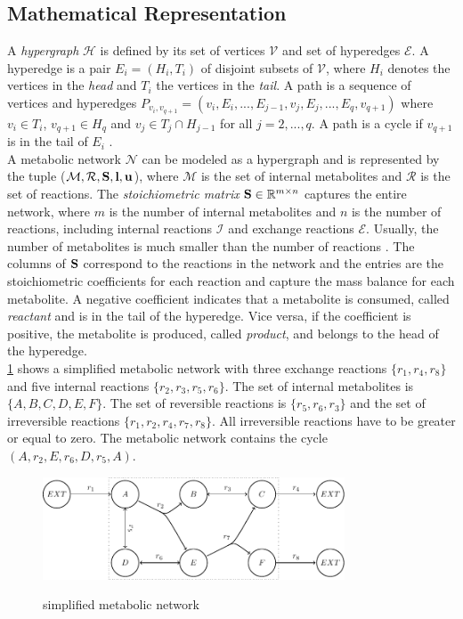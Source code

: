 \subsection{Mathematical Representation} \label{section:mathematical_representation}
A \textit{hypergraph} $\mathscr{H}$ is defined by its set of vertices $\mathscr{V}$ and set of hyperedges $\mathscr{E}$. A hyperedge is a pair $E_i= (H_i,T_i)$ of disjoint subsets of $\mathscr{V}$, where $H_i$ denotes the vertices in the \textit{head} and $T_i$ the vertices in the \textit{tail}. A path is a sequence of vertices and hyperedges $P_{v_i,v_{q+1}} = (v_i, E_i, ..., E_{j-1}, v_j, E_{j}, ..., E_q, v_{q+1})$ where $v_i \in T_i$, $v_{q+1} \in H_q$ and $v_j \in T_j \cap H_{j-1}$ for all $j = 2,...,q$. A path is a cycle if $v_{q+1}$ is in the tail of $E_i$ \cite{gallo_directed_1993}.\\ %
A metabolic network $\mathcal{N}$ can be modeled as a hypergraph and is represented by the tuple ($\mathcal{M}, \mathcal{R}, \bold S, \bold l, \bold u$), where $\mathcal M$ is the set of internal metabolites and $\mathcal{R}$ is the set of reactions. The \textit{stoichiometric matrix} $\bold S \in \mathbb{R}^{m\times n}$ captures the entire network, where $m$ is the number of internal metabolites and $n$ is the number of reactions, including internal reactions $\mathcal{I}$ and exchange reactions $\mathcal{E}$. Usually, the number of metabolites is much smaller than the number of reactions \cite{intro_computational_systems_biology}. 
The columns of $\bold S$ correspond to the reactions in the network and the entries are the stoichiometric coefficients for each reaction and capture the mass balance for each metabolite. A negative coefficient indicates that a metabolite is consumed, called \textit{reactant} and is in the tail of the hyperedge. Vice versa, if the coefficient is positive, the metabolite is produced, called \textit{product}, and belongs to the head of the hyperedge.\\
\cref{fig:simple_model} shows a simplified metabolic network with three exchange reactions $\{r_1, r_4, r_8\}$ and five internal reactions $\{r_2, r_3, r_5, r_6\}$. The set of internal metabolites is $\{A, B, C, D, E, F\}$. The set of reversible reactions is $\{r_5, r_6, r_3\}$ and the set of irreversible reactions $\{r_1, r_2, r_4, r_7, r_8\}$. All irreversible reactions have to be greater or equal to zero. The metabolic network contains the cycle $(A, r_2, E, r_6, D, r_5, A)$.

\begin{figure}[h!]
    \centering
    \caption{simplified metabolic network}
    \includegraphics[width=0.8\textwidth]{Images/tikz_graphs_model_with_hyperarcs.pdf}
    \label{fig:simple_model}
\end{figure}

